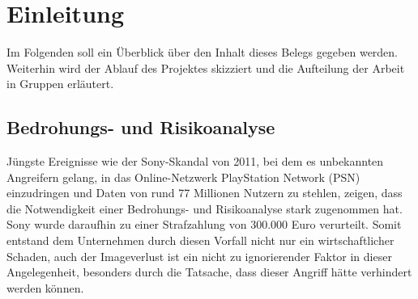 \section{Einleitung}
Im Folgenden soll ein Überblick über den Inhalt dieses Belegs gegeben werden. Weiterhin wird der Ablauf des Projektes skizziert und die Aufteilung der Arbeit in Gruppen erläutert.

\subsection{Bedrohungs- und Risikoanalyse}
Jüngste Ereignisse wie der Sony-Skandal von 2011, bei dem es unbekannten Angreifern gelang, in das Online-Netzwerk PlayStation Network (PSN) einzudringen und Daten von rund 77 Millionen Nutzern zu stehlen, zeigen, dass die Notwendigkeit einer Bedrohungs- und Risikoanalyse stark zugenommen hat. Sony wurde daraufhin zu einer Strafzahlung von 300.000 Euro verurteilt. Somit entstand dem Unternehmen durch diesen Vorfall nicht nur ein wirtschaftlicher Schaden, auch der Imageverlust ist ein nicht zu ignorierender Faktor in dieser Angelegenheit, besonders durch die Tatsache, dass dieser Angriff hätte verhindert werden können. 
\\
